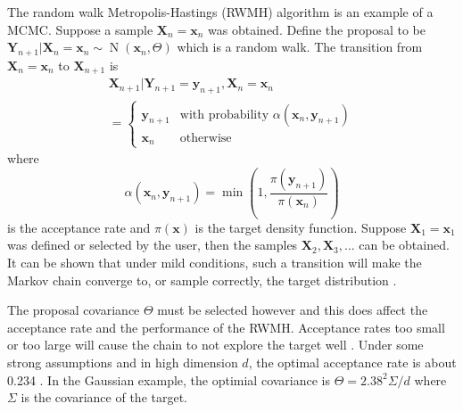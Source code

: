 \documentclass[10pt]{proc}
\DeclareMathOperator{\normal}{N}
\newcommand{\dotdotdot}{...}
\newcommand{\vect}[1]{\mathbf{#1}}
\newcommand{\matr}[1]{\mathsf{#1}}
\begin{document}
The random walk Metropolis-Hastings (RWMH) algorithm \citep{metropolis1953equation} \citep{hastings1970monte} is an example of a MCMC. Suppose a sample $\vect{X}_n = \vect{x}_n$ was obtained. Define the proposal to be $\vect{Y}_{n+1}|\vect{X}_n=\vect{x}_n \sim \normal\left(\vect{x}_n,\matr{\Theta}\right)$ which is a random walk. The transition from $\vect{X}_n=\vect{x}_n$ to $\vect{X}_{n+1}$ is
\begin{multline}
\vect{X}_{n+1}|\vect{Y}_{n+1} = \vect{y}_{n+1}, \vect{X}_{n} = \vect{x}_n
\\= 
	\begin{cases}
	\vect{y}_{n+1} & \text{with probability } \alpha\left(\vect{x}_n,\vect{y}_{n+1}\right) \\
	\vect{x}_n & \text{otherwise}
	\end{cases}
\end{multline}
where
\begin{equation}
\alpha\left(\vect{x}_{n},\vect{y}_{n+1}\right)=\min\left(1,\dfrac{\pi(\vect{y}_{n+1})}{\pi(\vect{x}_{n})}\right)
\end{equation}
is the acceptance rate and $\pi(\vect{x})$ is the target density function. Suppose $\vect{X}_1=\vect{x}_1$ was defined or selected by the user, then the samples $\vect{X}_2,\vect{X}_3,\dotdotdot$ can be obtained. It can be shown that under mild conditions, such a transition will make the Markov chain converge to, or sample correctly, the target distribution \citep{roberts1994simple}.

The proposal covariance $\matr{\Theta}$ must be selected however and this does affect the acceptance rate and the performance of the RWMH. Acceptance rates too small or too large will cause the chain to not explore the target well \citep{gelman1996efficient}. Under some strong assumptions and in high dimension $d$, the optimal acceptance rate is about 0.234 \citep{gelman1996efficient} \citep{roberts1997weak} \citep{rosenthal2011optimal}. In the Gaussian example, the optimial covariance is $\matr{\Theta}={2.38^2}\matr{\Sigma}/d$ where $\matr{\Sigma}$ is the covariance of the target.
\end{document}
